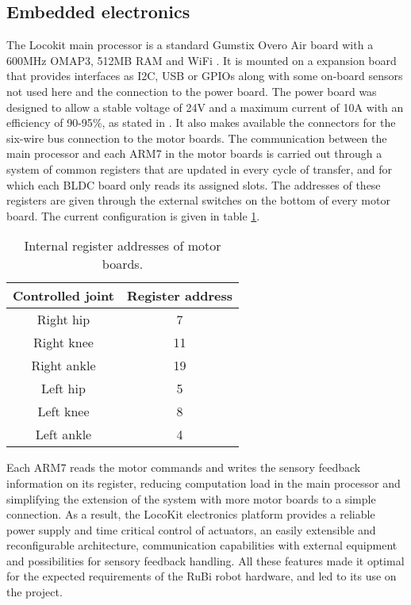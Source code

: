 
\subsection{Embedded electronics} %
\label{sub:locokit_electronics}
The Locokit main processor is a standard Gumstix Overo Air board with a 600MHz OMAP3, 512MB RAM and WiFi \cite{gumstix}.
It is mounted on a expansion board that provides interfaces as I2C, USB or GPIOs along with some on-board sensors not used here and the connection to the power board.
The power board was designed to allow a stable voltage of 24V and a maximum current of 10A with an efficiency of 90-95$\%$, as stated in \cite{locokit-electronics}.
It also makes available the connectors for the six-wire bus connection to the motor boards.
The communication between the main processor and each ARM7 in the motor boards is carried out through a system of common registers that are updated in every cycle of transfer, and for which each BLDC board only reads its assigned slots.
The addresses of these registers are given through the external switches on the bottom of every motor board.
The current configuration is given in table \ref{tab:motor_boards_addresses}.

\begin{table}
\begin{center}
\begin{tabular}{c | c}
  Controlled joint & Register address \\
  \hline
  Right hip & 7 \\
  Right knee & 11 \\
  Right ankle & 19 \\
  Left hip & 5 \\
  Left knee & 8\\
  Left ankle & 4 
\end{tabular}
\caption{Internal register addresses of motor boards.}
\label{tab:motor_boards_addresses}
\end{center}
\end{table}

Each ARM7 reads the motor commands and writes the sensory feedback information on its register, reducing computation load in the main processor and simplifying the extension of the system with more motor boards to a simple connection.
As a result, the LocoKit electronics platform provides a reliable power supply and time critical control of actuators, an easily extensible and reconfigurable architecture, communication capabilities with external equipment and possibilities for sensory feedback handling.
All these features made it optimal for the expected requirements of the RuBi robot hardware, and led to its use on the project. 



